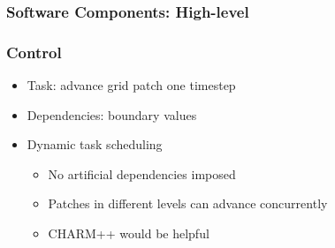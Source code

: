 \begin{frame}[fragile] \frametitle{Software Components: High-level}
\end{frame}
\begin{frame}[fragile] \frametitle{Control}
      \begin{itemize}
        \item Task: advance grid patch one timestep
        \item Dependencies: boundary values
        \item Dynamic task scheduling
        \begin{itemize}
          \item No artificial dependencies imposed
          \item Patches in different levels can advance concurrently
          \item CHARM++ would be helpful
        \end{itemize}
      \end{itemize}
\end{frame}
